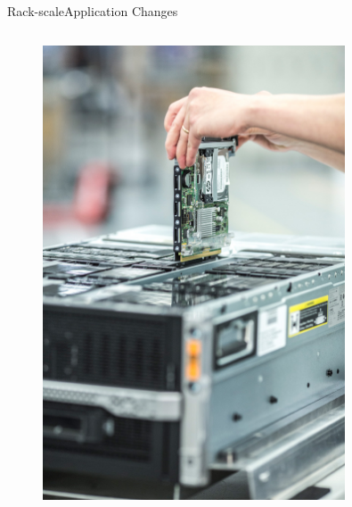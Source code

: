 \documentclass[10pt]{beamer}
\begin{document}
\begin{frame}{Rack-scale}{Application Changes}
  \begin{columns}[T]
    \begin{column}{.4\textwidth}
      \begin{figure}[ht]
        \centering
        \includegraphics[width=0.8\textwidth, keepaspectratio=true]{images/rack_scale.jpg}
      \end{figure}
    \end{column}


\end{columns}
\end{frame}
\end{document}
